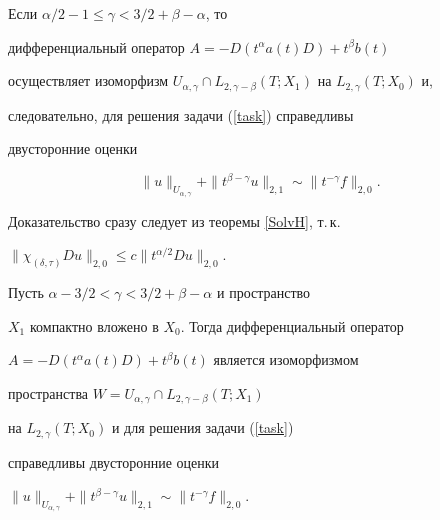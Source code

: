 \begin{cors}\label{main-var}


Если $\alpha/2-1 \le \gamma < 3/2+\beta-\alpha$, то


дифференциальный оператор $A =-D(t^\alpha a(t) D) + t^\beta b(t)$


осуществляет изоморфизм $U_{\alpha,\gamma} \cap


L_{2,\gamma-\beta}(T;X_1)$ на $L_{2,\gamma}(T;X_0)$ и,


следовательно, для решения задачи (\ref{task}) справедливы


двусторонние оценки


$$


\|u\|_{U_{\alpha,\gamma}}


+\|t^{\beta-\gamma} u\|_{2,1} \sim \|t^{-\gamma}f\|_{2,0}.


$$


\end{cors}





Доказательство сразу следует из теоремы \ref{SolvH}, т.\,к.


$\|\chi_{(\delta,\tau)}D u\|_{2,0} \le c \|t^{\alpha/2}D u\|_{2,0}$.





\begin{cors}\label{main-comp}


Пусть $\alpha-3/2 < \gamma < 3/2+\beta-\alpha$ и пространство


$X_1$ компактно вложено в $X_0$. Тогда дифференциальный оператор


$A =-D(t^\alpha a(t) D) + t^\beta b(t)$ является изоморфизмом


пространства $W=U_{\alpha,\gamma} \cap L_{2,\gamma-\beta}(T;X_1)$


на $L_{2,\gamma}(T;X_0)$ и для решения задачи (\ref{task})


справедливы двусторонние оценки


$\|u\|_{U_{\alpha,\gamma}}


+\|t^{\beta-\gamma} u\|_{2,1} \sim\|t^{-\gamma}f\|_{2,0}$.


\end{cors}





